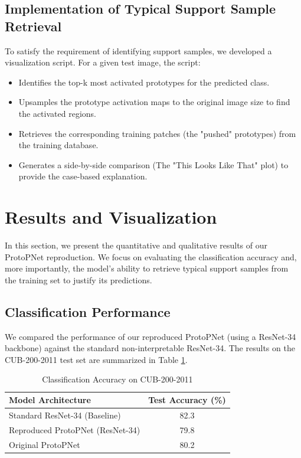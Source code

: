 \documentclass[conference]{IEEEtran}
\begin{document}
\subsection{Implementation of Typical Support Sample Retrieval}
To satisfy the requirement of identifying support samples, we developed a visualization script. For a given test image, the script:
\begin{itemize}
    \item Identifies the top-k most activated prototypes for the predicted class.
    \item Upsamples the prototype activation maps to the original image size to find the activated regions.
    \item Retrieves the corresponding training patches (the "pushed" prototypes) from the training database.
    \item Generates a side-by-side comparison (The "This Looks Like That" plot) to provide the case-based explanation.
\end{itemize}

\section{Results and Visualization}
\label{sec:results}
In this section, we present the quantitative and qualitative results of our ProtoPNet reproduction. We focus on evaluating the classification accuracy and, more importantly, the model's ability to retrieve typical support samples from the training set to justify its predictions.

\subsection{Classification Performance}
We compared the performance of our reproduced ProtoPNet (using a ResNet-34 backbone) against the standard non-interpretable ResNet-34. The results on the CUB-200-2011 test set are summarized in Table \ref{tab:accuracy}.

\begin{table}[t]
\centering
\caption{Classification Accuracy on CUB-200-2011}
\label{tab:accuracy}
\footnotesize 
\begin{tabular}{lc}
\hline
\textbf{Model Architecture} & \textbf{Test Accuracy (\%)} \\ \hline
Standard ResNet-34 (Baseline) & 82.3 \\
Reproduced ProtoPNet (ResNet-34) & 79.8 \\
Original ProtoPNet \cite{chen2019this} & 80.2 \\ \hline
\end{tabular}
\end{table}
\end{document}
